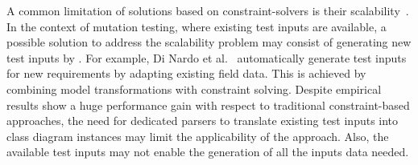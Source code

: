 A common limitation of solutions based on constraint-solvers is their scalability~\cite{di2017augmenting}. In the context of mutation testing, where existing test inputs are available, a possible solution to address the scalability problem may consist of generating new test inputs by .
For example, Di Nardo et al.~\cite{di2017augmenting} automatically generate test inputs for new requirements by adapting existing field data.
This is achieved by combining model transformations with constraint solving.
Despite empirical results show a huge performance gain with respect to traditional constraint-based approaches, the need for dedicated parsers to translate existing test inputs into class diagram instances may limit the applicability of the approach. Also, the available test inputs may not enable the generation of all the inputs data needed.

